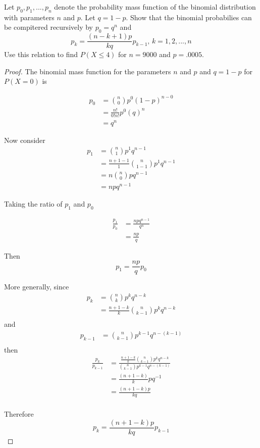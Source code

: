 \documentclass{tufte-book}
\theoremstyle{mytheoremstyle}
\theoremstyle{mylemstyle}
\theoremstyle{mydefstyle}
\begin{document}
Let $p_0, p_1,...,p_n$ denote the probability mass function of the binomial distribution with parameters $n$ and $p$.  Let $q=1-p$.  Show that the binomial probabilies can be compitered recursively by $p_0=q^n$ and
\[ p_k = \frac{(n-k+1)p}{kq}p_{k-1} \text{, } k=1,2,...,n \]
Use this relation to find $P(X\leq4)$ for $n=9000$ and $p=.0005$.

\begin{proof}The binomial mass function for the parameters $n$ and $p$ and $q=1-p$ for $P(X=0)$ is

\begin{align*}
p_0 &= \binom{n}{0}p^0(1-p)^{n-0}\\
&= \frac{n!}{0!n!}p^0(q)^n\\
&= q^n
\end{align*}

Now consider 
\begin{align*}
p_1 &= \binom{n}{1}p^1q^{n-1}\\
&= \frac{n+1-1}{1}\binom{n}{1-1}p^1q^{n-1}\\
&= n\binom{n}{0}pq^{n-1}\\
&= npq^{n-1}
\end{align*}

Taking the ratio of $p_1$ and $p_0$

\begin{align*}
\frac{p_1}{p_0} &= \frac{npq^{n-1}}{q^n}\\
&= \frac{np}{q}
\end{align*}

Then
\[ p_1 = \frac{np}{q}p_0 \]

More generally, since
\begin{align*}
p_k &= \binom{n}{k}p^kq^{n-k}\\
&= \frac{n+1-k}{k}\binom{n}{k-1}p^kq^{n-k}\\
\end{align*}
and
\begin{align*}
p_{k-1} &= \binom{n}{k-1}p^{k-1}q^{n-(k-1)}\\
\end{align*}
then
\begin{align*}
\frac{p_k}{p_{k-1}} &= \frac{\frac{n+1-k}{k}\binom{n}{k-1}p^kq^{n-k}}{\binom{n}{k-1}p^{k-1}q^{n-(k-1)}}\\
&= \frac{(n+1-k)}{k}pq^{-1}\\
&= \frac{(n+1-k)p}{kq}\\
\end{align*}

Therefore
\[p_k = \frac{(n+1-k)p}{kq}p_{k-1} \]
\end{proof}
\end{document}
